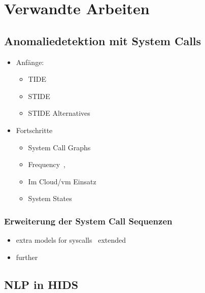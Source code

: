 \chapter{Verwandte Arbeiten}\label{ch:verwandte_arbeiten}
\section{Anomaliedetektion mit System Calls}

\begin{itemize}
    \item Anfänge:
        \begin{itemize}
            \item TIDE~\cite{FORREST}
            \item STIDE~\cite{STIDE}
            \item STIDE Alternatives~\cite{STIDE_Alternatives}
        \end{itemize}
    \item Fortschritte
        \begin{itemize}
            \item System Call Graphs~\cite{SYSCALL_GRAPHS}
            \item Frequency~\cite{FREQUENCY1},~\cite{FREQUENCY2}
            \item Im Cloud/vm Einsatz~\cite{VM}
            \item System States~\cite{SYSTEM_STATES}
        \end{itemize}
\end{itemize}

\subsection{Erweiterung der System Call Sequenzen}

\begin{itemize}
    \item extra models for syscalls~\cite{ARGUMENTS} extended~\cite{MAGGI}
    \item further~\cite{ARGUMENTS2}
\end{itemize}

\section{NLP in HIDS}

